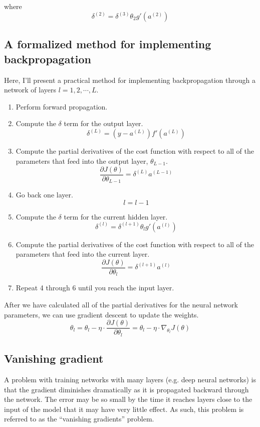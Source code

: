 \documentclass{article}
\begin{document}
where \[  \delta^{(2)} = \delta^{(3)} \theta_2 g'(a^{(2)}) \]


\subsection{A formalized method for implementing backpropagation}
Here, I'll present a practical method for implementing backpropagation through a network of layers $l=1,2,\cdots,L$.
\begin{enumerate}
\item Perform forward propagation.
\item Compute the $\delta$ term for the output layer.
\[ \delta^{(L)} = (y - a^{(L)}) f'(a^{(L)}) \]
\item Compute the partial derivatives of the cost function with respect to all of the parameters that feed into the output layer, $\theta_{L-1}$.
\[ \frac{\partial J(\theta)}{\partial \theta_{L-1}} =  \delta^{(L)} a^{(L-1)} \]
\item Go back one layer.
\[ l = l -1\]

\item Compute the $\delta$ term for the current hidden layer.
\[  \delta^{(l)} = \delta^{(l+1)} \theta_l g'(a^{(l)}) \]

\item Compute the partial derivatives of the cost function with respect to all of the parameters that feed into the current layer.
\[ \frac{\partial J(\theta)}{\partial \theta_{l}} =  \delta^{(l+1)} a^{(l)} \]
\item Repeat 4 through 6 until you reach the input layer.
\end{enumerate}
After we have calculated all of the partial derivatives for the neural network parameters, we can use gradient descent to update the weights.
\[\theta_l = \theta_l - \eta \cdot \frac{\partial J(\theta)}{\partial \theta_{l}} = \theta_l - \eta \cdot \nabla_{\theta_l} J( \theta)\]

\subsection{Vanishing gradient}

A problem with training networks with many layers (e.g. deep neural networks) is that the gradient diminishes dramatically as it is propagated backward through the network. The error may be so small by the time it reaches layers close to the input of the model that it may have very little effect. As such, this problem is referred to as the ``vanishing gradients'' problem.
\end{document}
